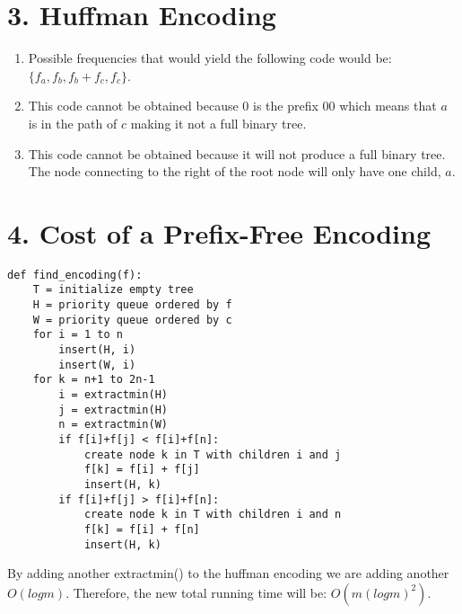 \documentclass[11pt]{article}
\newenvironment{qparts}{\begin{enumerate}[{(}a{)}]}{\end{enumerate}}
\begin{document}
\section*{3. Huffman Encoding}
\begin{qparts}

\item 

Possible frequencies that would yield the following code would be: $\{f_a, f_b, f_b + f_c, f_c\}$. 


\item 

This code cannot be obtained because 0 is the prefix 00 which means that $a$ is in the path of $c$ making it not a full binary tree. 


\item 

This code cannot be obtained because it will not produce a full binary tree. The node connecting to the right of the root node will only have one child, $a$.


\end{qparts}

\newpage
\section*{4. Cost of a Prefix-Free Encoding}

\begin{lstlisting}
def find_encoding(f): 
	T = initialize empty tree
	H = priority queue ordered by f 
	W = priority queue ordered by c
	for i = 1 to n
    	insert(H, i)
    	insert(W, i)
	for k = n+1 to 2n-1
	    i = extractmin(H)
	    j = extractmin(H)
	    n = extractmin(W)
	    if f[i]+f[j] < f[i]+f[n]:
		    create node k in T with children i and j
		    f[k] = f[i] + f[j]
		    insert(H, k)
	    if f[i]+f[j] > f[i]+f[n]:
		    create node k in T with children i and n
		    f[k] = f[i] + f[n]
		    insert(H, k)

\end{lstlisting}
By adding another extractmin() to the huffman encoding we are adding another $O(logm)$. Therefore, the new total running time will be: $O(m(logm)^2)$.


\newpage
\end{document}
